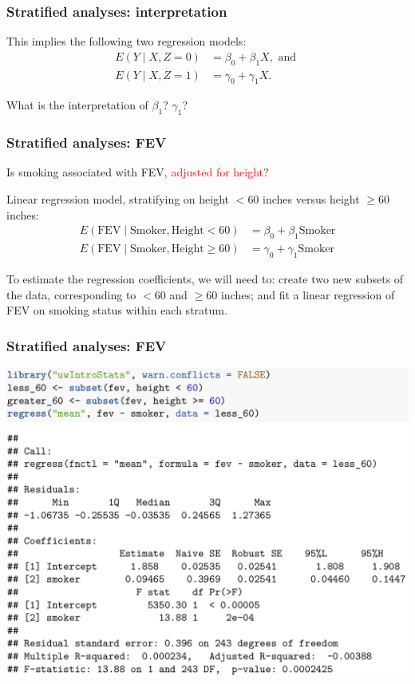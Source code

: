 \documentclass[12pt, 
hyperref={colorlinks=true, linkcolor=blue, urlcolor=cyan},dvipsnames]{beamer}
\begin{document}
\begin{frame}
\frametitle{Stratified analyses: interpretation}
\vspace{-2cm}This implies the following two regression models:
\begin{align*}
E(Y \mid X, Z = 0) &= \beta_0 + \beta_1 X, \text{ and } \\
E(Y \mid X, Z = 1) &= \gamma_0 + \gamma_1 X.
\end{align*}

What is the interpretation of $\beta_1$? $\gamma_1$?
\end{frame}

\begin{frame}
\frametitle{Stratified analyses: FEV}

Is smoking associated with FEV, \textcolor{red}{adjusted for height}?

Linear regression model, stratifying on height $< 60$ inches versus height $\geq 60$ inches:
\begin{align*}
E(\text{FEV} \mid \text{Smoker}, \text{Height} < 60) &= \beta_0 + \beta_1 \text{Smoker} \\
E(\text{FEV} \mid \text{Smoker}, \text{Height} \geq 60) &= \gamma_0 + \gamma_1 \text{Smoker} 
\end{align*}

To estimate the regression coefficients, we will need to: create two new subsets of the data, corresponding to $< 60$ and $\geq 60$ inches; and fit a linear regression of FEV on smoking status within each stratum.
\end{frame}

\begin{frame}
\frametitle{Stratified analyses: FEV}

\includegraphics[width=1\textwidth]{plots/fev_vs_smoke_stratified_less_60.png}

\end{frame}
\end{document}
